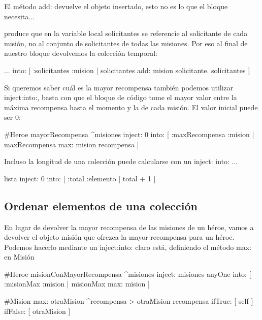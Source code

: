 \documentclass[a4paper,12pt]{book}
\begin{document}
El método add: devuelve el objeto insertado, esto no es lo que el bloque necesita...

\begin{code}
\end{code}

produce que en la variable local solicitantes se referencie al solicitante de cada misión, no al conjunto de
solicitantes de todas las misiones. Por eso al final de nuestro bloque devolvemos la colección temporal:

\begin{code}
          ... into: [ :solicitantes :mision | 
	             solicitantes add: mision solicitante. 
	             solicitantes  ] 
\end{code}

Si queremos saber cuál es la mayor recompensa también podemos utilizar inject:into:, basta
con que el bloque de código tome el mayor valor entre la máxima recompensa hasta el momento y
la de cada misión. El valor inicial puede ser 0:

\begin{code}
#Heroe
mayorRecompensa
   ^misiones inject: 0
             into: [ :maxRecompensa :mision | maxRecompensa max: mision recompensa ] 
\end{code}

Incluso la longitud de una colección puede calcularse con un inject: into: ...

\begin{code}
lista inject: 0
      into: [ :total :elemento | total + 1 ] 
\end{code}


\subsection{Ordenar elementos de una colección}
En lugar de devolver la mayor recompensa de las misiones de un héroe, vamos a devolver el objeto misión que
ofrezca la mayor recompensa para un héroe. Podemos hacerlo mediante un inject:into: claro está, definiendo el
método max: en Misión

\begin{code}
#Heroe
misionConMayorRecompensa
   ^misiones inject: misiones anyOne
             into: [ :misionMax :mision | misionMax max: mision ] 
             
#Mision
max: otraMision
    ^recompensa > otraMision recompensa
          ifTrue: [ self ]
          ifFalse: [ otraMision ]
\end{code}
\end{document}
